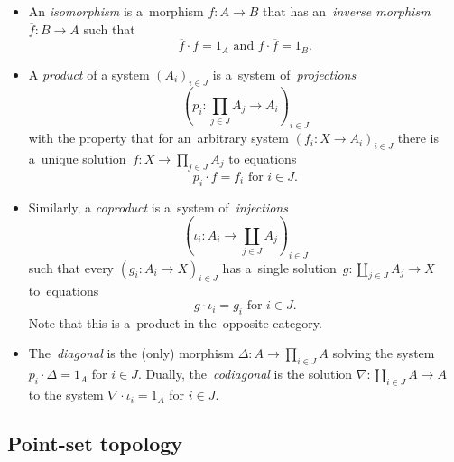 \begin{itemize}
\item An \emph{isomorphism} is a~morphism $f\colon A \to B$ that has
an~\emph{inverse morphism\/} $\overline{f}\colon B \to A$ such that
\[
  \overline{f} \cdot f = 1_A \text{ and } f \cdot \overline{f} = 1_B.
\]
\end{itemize}

\begin{itemize}
\item A \emph{product} of a system $\left(A_i\right)_{i\in J}$ is a~system
of~\emph{projections\/}
\[
  \left(p_i\colon \prod_{j\in J} A_j \to A_i \right)_{i\in J}
\]
with the property that for an~arbitrary system $\left(f_i\colon X \to
A_i\right)_{i\in J}$ there is a~unique solution~$f\colon X \to \prod_{j\in
J} A_j$ to equations
\[
  p_i \cdot f = f_i \text{ for } i\in J.
\]

\item Similarly, a \emph{coproduct} is a~system of~\emph{injections\/}
\[
  \left(\iota_i\colon A_i \to \coprod_{j\in J} A_j \right)_{i\in J}
\]
such that every $\left(g_i\colon A_i \to X \right)_{i\in J}$ has a~single
solution~$g\colon \coprod_{j\in J} A_j \to X$ to~equations
\[
  g \cdot \iota_i = g_i \text{ for } i\in J.
\]
Note that this is a~product in the~opposite category.

\item The~\emph{diagonal} is the (only) morphism $\Delta\colon A \to \prod_{i\in
J} A$ solving the system $p_i\cdot \Delta = 1_A$ for $i \in J$.
Dually, the~\emph{codiagonal} is the solution $\nabla\colon \coprod_{i\in J} A
\to A$ to the system $\nabla\cdot \iota_i = 1_A$ for $i \in J$.
\end{itemize}


\subsection*{Point-set topology}

